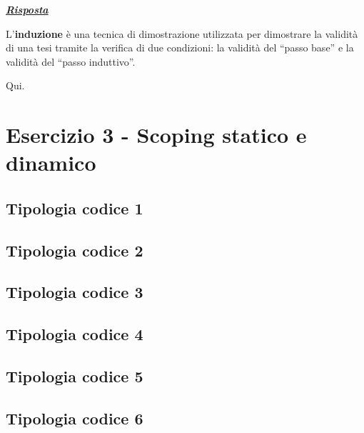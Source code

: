 \documentclass[a4paper]{article}
\newcommand{\dquotes}[1]{``#1''}
\begin{document}
	\noindent
	\textcolor{Green4}{\textbf{\emph{\underline{Risposta}}}}\newline
	
	\noindent
	L'\textbf{induzione} è una tecnica di dimostrazione utilizzata per dimostrare la validità di una tesi tramite la verifica di due condizioni: la validità del \dquotes{passo base} e la validità del \dquotes{passo induttivo}.\newline
	
	\noindent
	Qui.
	
	\newpage
	\section{Esercizio 3 - Scoping statico e dinamico}
	
	\subsection{Tipologia codice 1}
	
	
	\subsection{Tipologia codice 2}
	
	
	\subsection{Tipologia codice 3}
	
	
	\subsection{Tipologia codice 4}
	
	
	\subsection{Tipologia codice 5}
	
	
	\subsection{Tipologia codice 6}
	
	
\end{document}
